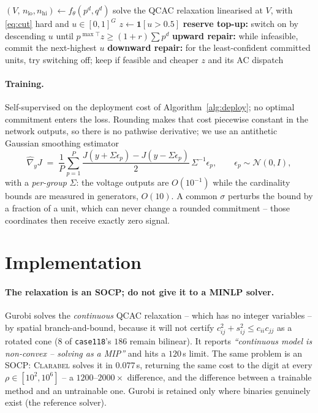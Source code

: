 \documentclass[11pt]{article}
\begin{document}
\begin{algorithm}[t]
\caption{Deployment: one continuous solve}\label{alg:deploy}
\begin{algorithmic}[1]
\State $(V,\,n_{\mathrm{lo}},n_{\mathrm{hi}}) \gets f_\theta(p^d,q^d)$
\State solve the QCAC relaxation linearised at $V$, with \eqref{eq:cut} hard and
       $u\in[0,1]^{G}$ 
\State $z \gets \mathbf{1}[u > 0.5]$
\State \textbf{reserve top-up:} switch on by descending $u$ until
       $p^{\max\!\top} z \ge (1+r)\sum p^d$
\State \textbf{upward repair:} while infeasible, commit the next-highest $u$
\State \textbf{downward repair:} for the least-confident committed units, try
       switching off; keep if feasible and cheaper
\State \Return $z$ and its AC dispatch
\end{algorithmic}
\end{algorithm}

\paragraph{Training.} Self-supervised on the deployment cost of
Algorithm~\ref{alg:deploy}; no optimal commitment enters the loss. Rounding
makes that cost piecewise constant in the network outputs, so there is no
pathwise derivative; we use an antithetic Gaussian smoothing estimator
\begin{equation}
\widehat{\nabla}_y J \;=\;
\frac{1}{P}\sum_{p=1}^{P}
\frac{J(y+\Sigma\epsilon_p)-J(y-\Sigma\epsilon_p)}{2}\,\Sigma^{-1}\epsilon_p ,
\qquad \epsilon_p\sim\mathcal{N}(0,I),
\end{equation}
with a \emph{per-group} $\Sigma$: the voltage outputs are $O(10^{-1})$ while the
cardinality bounds are measured in generators, $O(10)$. A common $\sigma$
perturbs the bound by a fraction of a unit, which can never change a rounded
commitment -- those coordinates then receive exactly zero signal.

\section{Implementation}

\paragraph{The relaxation is an SOCP; do not give it to a MINLP solver.}
Gurobi solves the \emph{continuous} QCAC relaxation -- which has no integer
variables -- by spatial branch-and-bound, because it will not certify
$c_{ij}^2+s_{ij}^2 \le c_{ii}c_{jj}$ as a rotated cone ($8$ of
\texttt{case118}'s $186$ remain bilinear). It reports \emph{``continuous model
is non-convex -- solving as a MIP''} and hits a $120$\,s limit. The same problem
is an SOCP: \textsc{Clarabel} solves it in $0.077$\,s, returning the same cost to
the digit at every $\rho\in[10^2,10^6]$ -- a $1200$--$2000\times$ difference, and
the difference between a trainable method and an untrainable one. Gurobi is
retained only where binaries genuinely exist (the reference solver).
\end{document}

